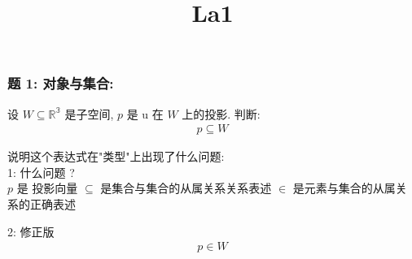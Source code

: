 \documentclass[12pt]{article}
\title{La1}
\date{}
\begin{document}
\maketitle

\begin{flushleft}
    \subsubsection{题 1: 对象与集合:}

    设 $W \subseteq \mathbb{R^{3}}$ 是子空间, $p$ 是 u 在 $W$ 上的投影.
    判断:
    \begin{align}
        p \subseteq W
    \end{align}

    说明这个表达式在"类型"上出现了什么问题: \\

    1: 什么问题 ? \\
    $p$ 是 投影向量 $\subseteq$ 是集合与集合的从属关系关系表述
    $\in$ 是元素与集合的从属关系的正确表述

    2: 修正版 \\
    \begin{align}
        p \in W
    \end{align}

\end{flushleft}
\end{document}

